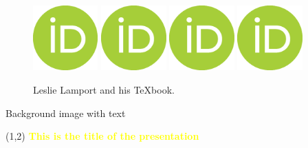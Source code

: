 \documentclass{beamer}
\begin{document}
\begin{frame}
\begin{figure}[!htpb]
\includegraphics[width=2.5cm]{figs/ORCIDiD_icon.png}
\includegraphics[width=2.5cm]{figs/ORCIDiD_icon.png}
\includegraphics[width=2.5cm]{figs/ORCIDiD_icon.png}
\includegraphics[width=2.5cm]{figs/ORCIDiD_icon.png}

\caption{Leslie Lamport and his TeXbook.}
\end{figure}
\end{frame}



{ 
\begin{frame}{Background image with text}
 \color{yellow}{ABCD}
 \begin{textblock}{10.0}(1,2)
  \textcolor{yellow}{\textbf{This is the title of the presentation}}
 \end{textblock}
 

\end{frame}}
\end{document}
